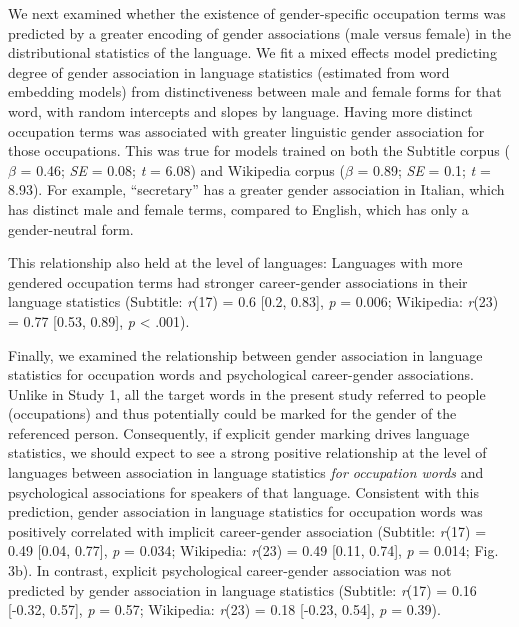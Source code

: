 \documentclass[9pt,twocolumn]{pnas-new}
\begin{document}
We next examined whether the existence of gender-specific occupation terms was predicted by a greater encoding of gender associations (male versus female) in the distributional statistics of the language. We fit a mixed effects model predicting degree of gender association in language statistics (estimated from word embedding models) from distinctiveness between male and female forms for that word, with random intercepts and slopes by language. Having more distinct occupation terms was associated with greater linguistic gender association for those occupations. This was true for models trained on both the Subtitle corpus (\(\beta\) = 0.46; \emph{SE} = 0.08; \emph{t} = 6.08) and Wikipedia
corpus (\(\beta\) = 0.89; \emph{SE} = 0.1; \emph{t} = 8.93). For example, \enquote{secretary} has a greater gender association in Italian, which has distinct male and female terms, compared to English, which has only a gender-neutral form. 

This relationship also held at the level of languages: Languages with more
gendered occupation terms had stronger career-gender associations in their language statistics
(Subtitle: \emph{r}(17) = 0.6 {[}0.2, 0.83{]}, \emph{p} = 0.006; Wikipedia: \emph{r}(23) = 0.77 {[}0.53, 0.89{]}, \emph{p} \textless{} .001).

Finally, we examined the relationship between gender association in language
statistics for occupation words and psychological career-gender associations. Unlike in Study 1, all the target words in the present study referred to
people (occupations) and thus potentially could be marked for the gender
of the referenced person. Consequently, if explicit gender marking
drives language statistics, we should expect to see a strong positive
relationship at the level of languages between association in language
statistics \emph{for occupation words} and psychological associations for
speakers of that language. Consistent with this prediction, gender association
in language statistics for occupation words was positively correlated
with implicit career-gender association (Subtitle: \emph{r}(17) = 0.49 {[}0.04, 0.77{]}, \emph{p} = 0.034; Wikipedia: \emph{r}(23) = 0.49 {[}0.11, 0.74{]}, \emph{p} = 0.014; Fig. 3b). In contrast,  explicit psychological career-gender association was not predicted by gender association in language statistics (Subtitle: \emph{r}(17) = 0.16 {[}-0.32, 0.57{]}, \emph{p} = 0.57; Wikipedia: \emph{r}(23) = 0.18 {[}-0.23, 0.54{]}, \emph{p} = 0.39).
\end{document}
